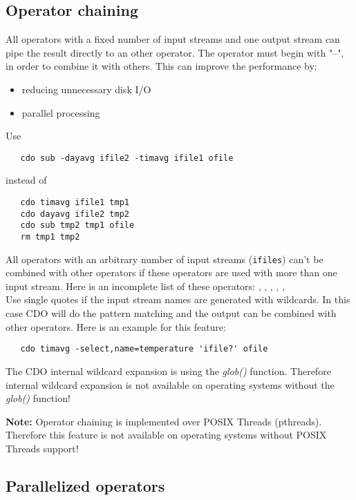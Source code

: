 \subsection{Operator chaining}

All operators with a fixed number of input streams and one output stream
can pipe the result directly to an other operator.
The operator must begin with "--", in order to combine it with others.
This can improve the performance by:
\begin{itemize}
\item reducing unnecessary disk I/O
\item parallel processing
\end{itemize}
Use
\begin{verbatim}
   cdo sub -dayavg ifile2 -timavg ifile1 ofile
\end{verbatim}
instead of
\begin{verbatim}
   cdo timavg ifile1 tmp1
   cdo dayavg ifile2 tmp2
   cdo sub tmp2 tmp1 ofile
   rm tmp1 tmp2
\end{verbatim}

All operators with an arbitrary number of input streams ({\tt ifiles})
can't be combined with other operators if these operators are used
with more than one input stream. Here is an incomplete list of
these operators:
{\bf {}},
{\bf {}},
{\bf {}},
{\bf {}},
{\bf {}},
{\bf {}} \\
Use single quotes if the input stream names are generated with
wildcards. In this case CDO will do the pattern matching and the
output can be combined with other operators. Here is an example for
this feature:
\begin{verbatim}
   cdo timavg -select,name=temperature 'ifile?' ofile
\end{verbatim}

The CDO internal wildcard expansion is using the {\it glob()} function. 
Therefore internal wildcard expansion is not available on operating systems without the {\it glob()} function!

{\bf Note:}
Operator chaining is implemented over POSIX Threads (pthreads).
Therefore this {\CDO} feature is not available on operating systems without POSIX Threads support!


\subsection{Parallelized operators}

